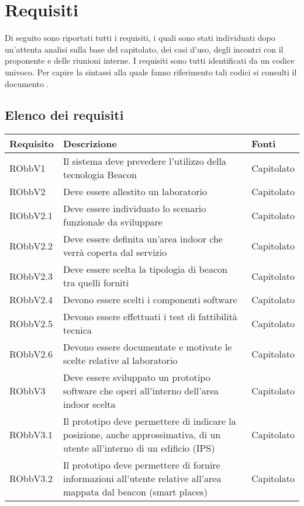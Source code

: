 \documentclass[../AnalisiDeiRequisiti.tex]{subfiles}
\begin{document}
\section{Requisiti}
	Di seguito sono riportati tutti i requisiti, i quali sono stati individuati dopo un'attenta analisi sulla base del capitolato, dei casi d’uso, degli incontri con il proponente e delle riunioni interne.
I requisiti sono tutti identificati da un codice univoco. Per capire la sintassi alla quale fanno riferimento tali codici si consulti il documento \normediprogettov.
	\subsection{Elenco dei requisiti}
	\begin{longtabu} to \textwidth {X X[2] X}
\toprule
\textbf{Requisito} & \textbf{Descrizione} & \textbf{Fonti}\\
\midrule
\endhead
{} 
RObbV1 & Il sistema deve prevedere l'utilizzo della tecnologia Beacon & Capitolato \\ 
\midrule 
RObbV2 & Deve essere allestito un laboratorio & Capitolato \\ 
\midrule 
RObbV2.1 & Deve essere individuato lo scenario funzionale da sviluppare & Capitolato \\ 
\midrule 
RObbV2.2 & Deve essere definita un'area indoor che verrà coperta dal servizio & Capitolato \\ 
\midrule 
RObbV2.3 & Deve essere scelta la tipologia di beacon tra quelli forniti & Capitolato \\ 
\midrule 
RObbV2.4 & Devono essere scelti i componenti software & Capitolato \\ 
\midrule 
RObbV2.5 & Devono essere effettuati i test di fattibilità tecnica & Capitolato \\ 
\midrule 
RObbV2.6 & Devono essere documentate e motivate le scelte relative al laboratorio & Capitolato \\ 
\midrule 
RObbV3 & Deve essere sviluppato un prototipo software che operi all'interno dell'area indoor scelta & Capitolato \\ 
\midrule 
RObbV3.1 & Il prototipo deve permettere di indicare la posizione, anche approssimativa, di un utente all'interno di un edificio (IPS) & Capitolato \\ 
\midrule 
RObbV3.2 & Il prototipo deve permettere di fornire informazioni all'utente relative all'area mappata dal beacon (smart places) & Capitolato \\ 

\end{longtabu}
\end{document}
